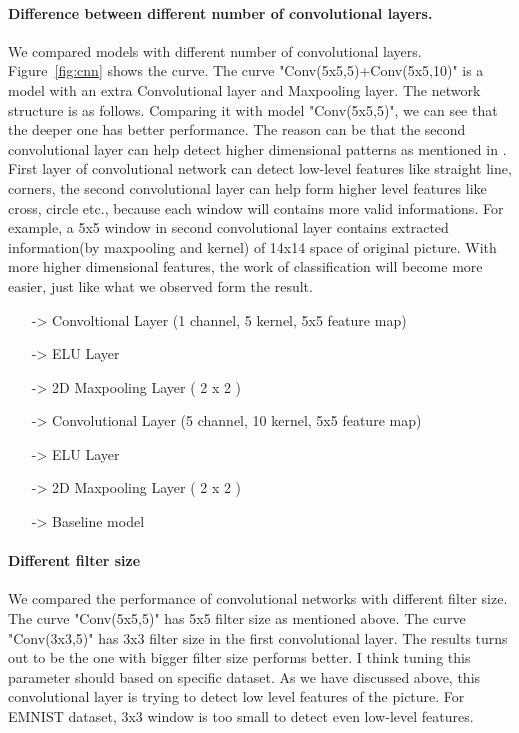 \documentclass{article}
\begin{document}
\paragraph{Difference between different number of convolutional layers. }
We compared models with different number of convolutional layers. Figure~\ref{fig:cnn} shows the curve. The curve "Conv(5x5,5)+Conv(5x5,10)" is a model with an extra Convolutional layer and Maxpooling layer. The network structure is as follows. Comparing it with model "Conv(5x5,5)", we can see that the deeper one has better performance. The reason can be that the second convolutional layer can help detect higher dimensional patterns as mentioned in \citep{Lecun98gradient-basedlearning}. First layer of convolutional network can detect low-level features like straight line, corners, the second convolutional layer can help form higher level features like cross, circle etc., because each window will contains more valid informations. For example, a 5x5 window in second convolutional layer contains extracted information(by maxpooling and kernel) of 14x14 space of original picture. With more higher dimensional features, the work of classification will become more easier, just like what we observed form the result.

\begin{itemize}
	\item[->] Convoltional Layer (1 channel, 5 kernel, 5x5 feature map)
	\item[->] ELU Layer
	\item[->] 2D Maxpooling Layer ( 2 x 2 )
	\item[->] Convolutional Layer (5 channel, 10 kernel, 5x5 feature map)
	\item[->] ELU Layer
	\item[->] 2D Maxpooling Layer ( 2 x 2 )
	\item[->] Baseline model
\end{itemize}



\paragraph{Different filter size}
We compared the performance of convolutional networks with different filter size. The curve "Conv(5x5,5)" has 5x5 filter size as mentioned above. The curve "Conv(3x3,5)" has 3x3 filter size in the first convolutional layer. The results turns out to be the one with bigger filter size performs better. I think tuning this parameter should based on specific dataset. As we have discussed above, this convolutional layer is trying to detect low level features of the picture. For EMNIST dataset, 3x3 window is too small to detect even low-level features.
\end{document}
